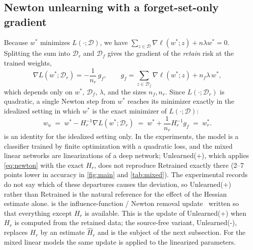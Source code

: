 \documentclass[10pt,twocolumn,letterpaper]{article}
\begin{document}
\subsection{Newton unlearning with a forget-set-only gradient}
\label{sec:newton}
Because $w^*$ minimizes $L(\cdot;\mathcal D)$, we have $\sum_{z\in\mathcal D}\nabla\ell(w^*;z)+n\lambda w^*=0$. Splitting the sum into $\mathcal D_r$ and $\mathcal D_f$ gives the gradient of the \emph{retain} risk at the trained weights,
\begin{equation}
  \nabla L(w^*;\mathcal D_r)=-\frac1{n_r}\,g_f,\qquad g_f=\sum_{z\in\mathcal D_f}\nabla\ell(w^*;z)+n_f\lambda\, w^*,
  \label{eq:gf}
\end{equation}
which depends only on $w^*$, $\mathcal D_f$, $\lambda$, and the sizes $n_f,n_r$. Since $L(\cdot;\mathcal D_r)$ is quadratic, a single Newton step from $w^*$ reaches its minimizer exactly in the idealized setting in which $w^*$ is the exact minimizer of $L(\cdot;\mathcal D)$:
\begin{equation}
  w_u \;=\; w^*-H_r^{-1}\nabla L(w^*;\mathcal D_r)\;=\;w^*+\frac1{n_r}H_r^{-1}g_f \;=\; w^*_r .
  \label{eq:newton}
\end{equation}
 is an identity for the idealized setting only. In the experiments, the model is a classifier trained by finite optimization with a quadratic loss, and the mixed linear networks are linearizations of a deep network; Unlearned(+), which applies \cref{eq:newton} with the exact $H_r$, does not reproduce Retrained exactly there (2--7 points lower in accuracy in \cref{fig:main} and \cref{tab:mixed}). The experimental records do not say which of these departures causes the deviation, so Unlearned(+) rather than Retrained is the natural reference for the effect of the Hessian estimate alone.  is the influence-function / Newton removal update~\cite{koh2017understanding,guo2020certified} written so that everything except $H_r$ is available. This is the update of Unlearned(+) when $H_r$ is computed from the retained data; the source-free variant, Unlearned(-), replaces $H_r$ by an estimate $\widehat H_r$ and is the subject of the next subsection. For the mixed linear models the same update is applied to the linearized parameters.
\end{document}
